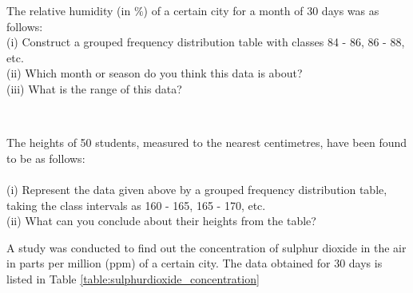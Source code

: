 \item The relative humidity (in $\%$) of a certain city for a month of 30 days was as follows:\\
(i) Construct a grouped frequency distribution table with classes 84 - 86, 86 - 88, etc.\\
(ii) Which month or season do you think this data is about?\\
(iii) What is the range of this data?\\
\begin{table}[ht!]
\caption{Relative Humidity}
\label{table:docq30statex}
\end{table}
\\
\solution

\item The heights of 50 students, measured to the nearest centimetres, have been found to be as follows:\\
\\

(i) Represent the data given above by a grouped frequency distribution table, taking the class intervals as 160 - 165, 165 - 170, etc.\\
(ii) What can you conclude about their heights from the table?\\
\item 
A study was conducted to find out the concentration of sulphur dioxide in the air in parts per million (ppm) of a certain city. The data obtained for 30 days is listed in Table \ref{table:sulphurdioxide_concentration}

